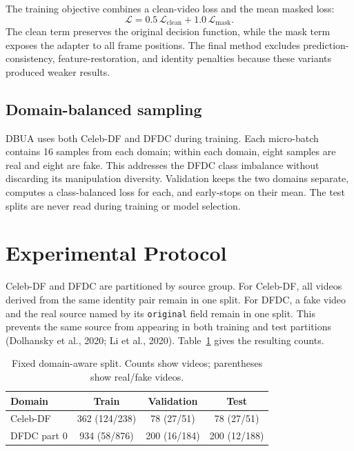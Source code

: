 \documentclass[10pt,twocolumn]{article}
\begin{document}
The training objective combines a clean-video loss and the mean masked loss:
\begin{equation}
  \mathcal{L}=0.5\,\mathcal{L}_{\mathrm{clean}}
  +1.0\,\mathcal{L}_{\mathrm{mask}}.
\end{equation}
The clean term preserves the original decision function, while the mask term
exposes the adapter to all frame positions. The final method excludes
prediction-consistency, feature-restoration, and identity penalties because
these variants produced weaker results.

\subsection{Domain-balanced sampling}

DBUA uses both Celeb-DF and DFDC during training. Each micro-batch contains 16
samples from each domain; within each domain, eight samples are real and eight
are fake. This addresses the DFDC class imbalance without discarding its
manipulation diversity. Validation keeps the two domains separate, computes a
class-balanced loss for each, and early-stops on their mean. The test splits
are never read during training or model selection.

\section{Experimental Protocol}

Celeb-DF and DFDC are partitioned by source group. For Celeb-DF, all videos
derived from the same identity pair remain in one split. For DFDC, a fake video
and the real source named by its \texttt{original} field remain in one split.
This prevents the same source from appearing in both training and test
partitions (Dolhansky et al., 2020; Li et al., 2020). Table~\ref{tab:data}
gives the resulting counts.

\begin{table}[t]
  \centering
  \caption{Fixed domain-aware split. Counts show videos; parentheses show
  real/fake videos.}
  \label{tab:data}
  \small
  \begin{tabular}{@{}lccc@{}}
    \toprule
    Domain & Train & Validation & Test \\
    \midrule
    Celeb-DF & 362 (124/238) & 78 (27/51) & 78 (27/51) \\
    DFDC part 0 & 934 (58/876) & 200 (16/184) & 200 (12/188) \\
    \bottomrule
  \end{tabular}
\end{table}
\end{document}
